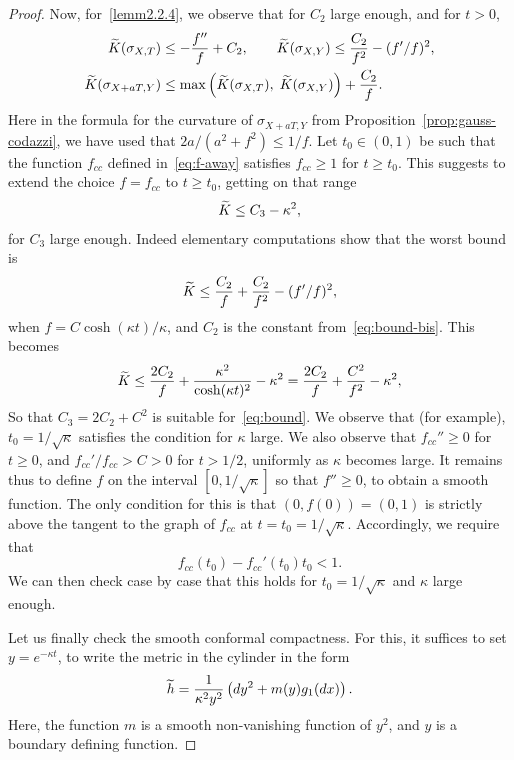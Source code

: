 \documentclass[AHL,Unicode,longabstracts,published]{cedram}
\theoremstyle{plain}
\let\oldtilde\tilde
\renewcommand*{\tilde}[1]{\mathchoice{\widetilde{#1}}{\widetilde{#1}}{\oldtilde{#1}}{\oldtilde{#1}}}
\begin{document}
\begin{proof}
Now, for~\eqref{lemm2.2.4}, we observe that for $C_2$ large enough, and for $t > 0$,
\begin{align}\label{eq:bound-bis}
\tilde{K}(\sigma_{X,T}) &\leq - \frac{f''}{f} + C_2,\qquad \tilde{K}(\sigma_{X,Y}) \leq \frac{C_2}{f^2} - (f'/f)^2,
\\
\tilde{K}(\sigma_{X+aT,Y}) &\leq \max\left(\tilde{K}(\sigma_{X,T}),\; \tilde{K}(\sigma_{X,Y})\right) + \frac{C_2}{f}.\nonumber
\end{align}
Here in the formula for the curvature of $\sigma_{X+aT,Y}$ from Proposition~\ref{prop:gauss-codazzi}, we have used that $2a/(a^2+f^2)\leq 1/f$. Let $t_0\in(0,1)$ be such that the function $f_{cc}$ defined in~\eqref{eq:f-away} satisfies $f_{cc}\geq 1$ for $t\geq t_0$. This suggests to extend the choice $f=f_{cc}$ to $t\geq t_0$, getting on that range
\begin{equation}\label{eq:bound}
\tilde{K} \leq C_3 - \kappa^2,
\end{equation}
for $C_3$ large enough. Indeed elementary computations show that the worst bound is
\[
\tilde{K} \leq \frac{C_2}{f} + \frac{C_2}{f^2} - (f'/f)^2,
\]
when $f= C \cosh(\kappa t)/\kappa$, and $C_2$ is the constant from~\eqref{eq:bound-bis}. This becomes
\[
\tilde{K} \leq \frac{2C_2}{f} + \frac{\kappa^2}{\cosh(\kappa t)^2} - \kappa^2 = \frac{2C_2}{f} + \frac{C^2}{f^2} - \kappa^2,
\]
So that $C_3= 2C_2 +C^2$ is suitable for~\eqref{eq:bound}. We observe that (for example), $t_0 = 1/\sqrt{\kappa}$ satisfies the condition for $\kappa$ large. We also observe that $f_{cc}''\geq 0$ for $t\geq 0$, and $f_{cc}'/f_{cc}> C>0$ for $t>1/2$, uniformly as $\kappa$ becomes large. It remains thus to define $f$ on the interval $[0,1/\sqrt{\kappa}]$ so that $f''\geq 0$, to obtain a smooth function. The only condition for this is that $(0,f(0))=(0,1)$ is strictly above the tangent to the graph of $f_{cc}$ at $t=t_0 =1/\sqrt{\kappa}$. Accordingly, we require that
\[
f_{cc}(t_0) - f_{cc}'(t_0) t_0 < 1.
\]
We can then check case by case that this holds for $t_0 = 1/\sqrt{\kappa}$ and $\kappa$ large enough.

Let us finally check the smooth conformal compactness. For this, it suffices to set $y = e^{-\kappa t}$, to write the metric in the cylinder in the form
\[
\tilde{h} = \frac{1}{\kappa^2 y^2}\left(dy^2 + m(y)g_1(dx)\right).
\]
Here, the function $m$ is a smooth non-vanishing function of $y^2$, and $y$ is a boundary defining function.
\end{proof}
\end{document}
